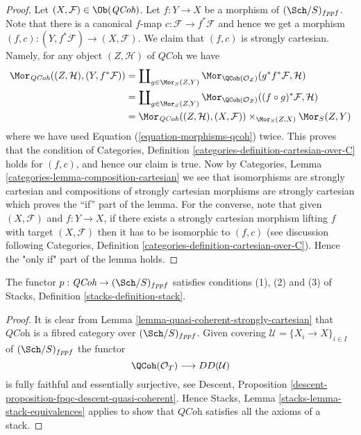 \begin{proof}
Let $(X, \mathcal{F}) \in \Ob(\textit{QCoh})$.
Let $f : Y \to X$ be a morphism of $(\Sch/S)_{fppf}$.
Note that there is a canonical $f$-map $c : \mathcal{F} \to f^*\mathcal{F}$
and hence we get a morphism
$(f, c) : (Y, f^*\mathcal{F}) \to (X, \mathcal{F})$.
We claim that $(f, c)$ is strongly cartesian.
Namely, for any object $(Z, \mathcal{H})$ of $\textit{QCoh}$ we have
\begin{align*}
\Mor_{\textit{QCoh}}((Z, \mathcal{H}), (Y, f^*\mathcal{F}))
& =
\coprod\nolimits_{g \in \Mor_S(Z, Y)}
\Mor_{\QCoh(\mathcal{O}_Z)}(g^*f^*\mathcal{F}, \mathcal{H}) \\
& =
\coprod\nolimits_{g \in \Mor_S(Z, Y)}
\Mor_{\QCoh(\mathcal{O}_Z)}((f \circ g)^*\mathcal{F}, \mathcal{H}) \\
& =
\Mor_{\textit{QCoh}}((Z, \mathcal{H}), (X, \mathcal{F}))
\times_{\Mor_S(Z, X)} \Mor_S(Z, Y)
\end{align*}
where we have used Equation (\ref{equation-morphisms-qcoh}) twice.
This proves that the condition of
Categories, Definition \ref{categories-definition-cartesian-over-C}
holds for $(f, c)$, and hence our claim is true. Now by
Categories, Lemma \ref{categories-lemma-composition-cartesian}
we see that isomorphisms are strongly cartesian and
compositions of strongly cartesian morphisms are strongly cartesian
which proves the ``if'' part of the lemma. For the converse, note
that given $(X, \mathcal{F})$ and $f : Y \to X$, if there exists a
strongly cartesian morphism lifting $f$ with target $(X, \mathcal{F})$
then it has to be isomorphic to $(f, c)$ (see discussion following
Categories, Definition \ref{categories-definition-cartesian-over-C}).
Hence the "only if" part of the lemma holds.
\end{proof}

\begin{lemma}
\label{lemma-stack-of-quasi-coherent-sheaves}
The functor $p : \textit{QCoh} \to (\Sch/S)_{fppf}$
satisfies conditions (1), (2) and (3) of
Stacks, Definition \ref{stacks-definition-stack}.
\end{lemma}

\begin{proof}
It is clear from
Lemma \ref{lemma-quasi-coherent-strongly-cartesian}
that $\textit{QCoh}$ is a fibred category over $(\Sch/S)_{fppf}$.
Given covering $\mathcal{U} = \{X_i \to X\}_{i \in I}$ of
$(\Sch/S)_{fppf}$ the functor
$$
\QCoh(\mathcal{O}_T) \longrightarrow DD(\mathcal{U})
$$
is fully faithful and essentially surjective, see
Descent, Proposition \ref{descent-proposition-fpqc-descent-quasi-coherent}.
Hence
Stacks, Lemma \ref{stacks-lemma-stack-equivalences}
applies to show that $\textit{QCoh}$ satisfies all the
axioms of a stack.
\end{proof}





